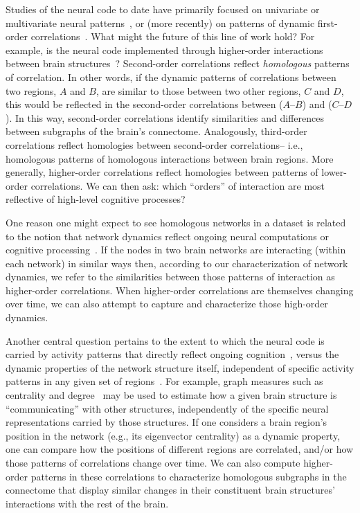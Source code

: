 \documentclass[english]{article}
\begin{document}
Studies of the neural code to date have primarily focused on
univariate or multivariate neural patterns~\citep[for review
see][]{NormEtal06}, or (more recently) on patterns of dynamic
first-order correlations~\citep[i.e., interactions between pairs of
brain structures;][]{MannEtal18, FongEtal19, LuriEtal18, PretEtal17,
  ZouEtal19, DemeEtal19}.  What might the future of this line of work
hold?  For example, is the neural code implemented through
higher-order interactions between brain structures~\citep[e.g.,
see][]{ReimEtal17}?  Second-order correlations reflect
\textit{homologous} patterns of correlation.  In other words, if the
dynamic patterns of correlations between two regions, $A$ and $B$, are
similar to those between two other regions, $C$ and $D$, this would be
reflected in the second-order correlations between ($A$--$B$) and
($C$--$D$).  In this way, second-order correlations identify
similarities and differences between subgraphs of the brain's
connectome.  Analogously, third-order correlations reflect homologies
between second-order correlations-- i.e., homologous patterns of
homologous interactions between brain regions.  More generally,
higher-order correlations reflect homologies between patterns of
lower-order correlations.  We can then ask: which ``orders'' of
interaction are most reflective of high-level cognitive processes?

One reason one might expect to see homologous networks in a dataset is
related to the notion that network dynamics reflect ongoing neural
computations or cognitive processing~\citep[e.g.,][]{BeatEtal16}.  If
the nodes in two brain networks are interacting (within each network)
in similar ways then, according to our characterization of network
dynamics, we refer to the similarities between those patterns of
interaction as higher-order correlations.  When higher-order
correlations are themselves changing over time, we can also attempt to
capture and characterize those high-order dynamics.

Another central question pertains to the extent to which the neural
code is carried by activity patterns that directly reflect ongoing
cognition~\citep[e.g., following][]{HaxbEtal01, NormEtal06}, versus
the dynamic properties of the network structure itself, independent of
specific activity patterns in any given set of regions~\citep[e.g.,
following][]{BassEtal06}.  For example, graph measures such as
centrality and degree~\citep{BullSpor09} may be used to estimate how a
given brain structure is ``communicating'' with other structures,
independently of the specific neural representations carried by those
structures.  If one considers a brain region's position in the network
(e.g., its eigenvector centrality) as a dynamic property, one can
compare how the positions of different regions are correlated, and/or
how those patterns of correlations change over time.  We can also
compute higher-order patterns in these correlations to characterize
homologous subgraphs in the connectome that display similar changes in
their constituent brain structures' interactions with the rest of the
brain.
\end{document}
